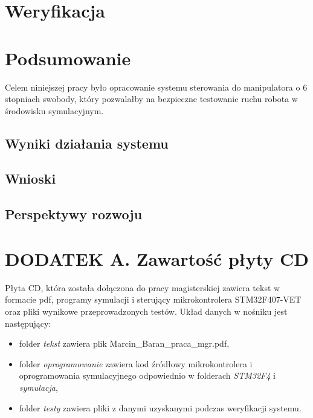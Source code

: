 \documentclass[a4paper, 12pt, twoside]{article}
\begin{document}

\newpage
\vspace*{1.5 cm}
\section{Weryfikacja}
\vspace{1.5 cm}

\newpage
\vspace*{1.5 cm}
\section{Podsumowanie}
\vspace{3.0 cm}
Celem niniejszej pracy było opracowanie systemu sterowania do manipulatora o 6 stopniach swobody, który pozwalałby na bezpieczne testowanie ruchu robota w środowisku symulacyjnym.

\subsection{Wyniki działania systemu}
\subsection{Wnioski}
\subsection{Perspektywy rozwoju}
\newpage
\section*{DODATEK A. Zawartość płyty CD}
\vspace{3.0 cm}
Płyta CD, która została dołączona do pracy magisterskiej zawiera tekst w formacie pdf, programy symulacji i sterujący mikrokontrolera STM32F407-VET oraz pliki wynikowe przeprowadzonych testów. Układ danych w nośniku jest następujący:
\begin{itemize}
\item folder \textit{tekst} zawiera plik Marcin\_Baran\_praca\_mgr.pdf,
\item folder \textit{oprogramowanie} zawiera kod źródłowy mikrokontrolera i oprogramowania symulacyjnego odpowiednio w folderach \textit{STM32F4} i \textit{symulacja},
\item folder \textit{testy} zawiera pliki z danymi uzyskanymi podczas weryfikacji systemu.
\end{itemize}
\end{document}
